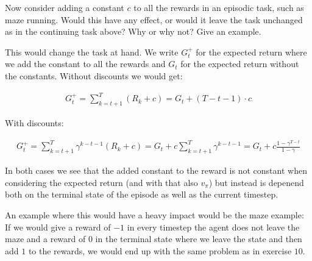 \begin{exercise}
Now consider adding a constant $c$ to all the rewards in an episodic task, such as maze running.
Would this have any effect, or would it leave the task unchanged as in the continuing task above?
Why or why not?
Give an example.
\end{exercise}

\begin{solution}
  This would change the task at hand. We write $G^+_t$ for the expected return where we add the constant to all the rewards and $G_t$ for the expected return without the constants. Without discounts we would get:

  \begin{align*}
    G_t^+
    =
    \sum_{k=t+1}^T (R_k + c)
    =
    G_t + (T-t-1)\cdot c
  \end{align*}

  With discounts:

  \begin{align*}
    G_t^+
    =
    \sum_{k=t+1}^T \gamma^{k-t-1}(R_k + c)
    =
    G_t + c \sum_{k=t+1}^T \gamma^{k-t-1}
    =
    G_t + c \frac{1-\gamma^{T-t}}{1-\gamma}
  \end{align*}

  In both cases we see that the added constant to the reward is not constant when considering the expected return (and with that also $v_\pi$) but instead is depenend both on the terminal state of the episode as well as the current timestep.

  An example where this would have a heavy impact would be the maze example: If we would give a reward of $-1$ in every timestep the agent does not leave the maze and a reward of $0$ in the terminal state where we leave the state and then add $1$ to the rewards, we would end up with the same problem as in exercise $10$.
\end{solution}
